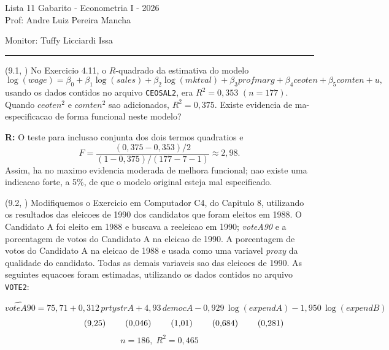 \documentclass[12pt,letterpaper, onecolumn]{exam}
\renewenvironment{solution}
{\par\noindent\textbf{R:}\enspace\color{blue}}
{\par\color{black}}
\begin{document}
\begingroup
\centering
\LARGE Lista 11 Gabarito - Econometria I - 2026\\[0.5em]
\large Prof: Andre Luiz Pereira Mancha \par
\large Monitor: Tuffy Licciardi Issa \par
\endgroup
\rule{\textwidth}{0.4pt}
\pointsdroppedatright
\printanswers
\renewcommand{\solutiontitle}{\noindent\textbf{Ans:}\enspace}
\newcommand{\qstar}{\hspace{-0.6em}\textsuperscript{*}\hspace{0.2em}}

\begin{questions}

\question (9.1, \citep{wooldridge2016}) No Exercicio 4.11, o \(R\)-quadrado da estimativa do modelo
\[
\log(wage)=\beta_0+\beta_1\log(sales)+\beta_2\log(mktval)+\beta_3 profmarg+\beta_4 ceoten+\beta_5 comten+u,
\]
usando os dados contidos no arquivo \texttt{CEOSAL2}, era \(R^2=0{,}353\) \((n=177)\). Quando \(ceoten^2\) e \(comten^2\) sao adicionados, \(R^2=0{,}375\). Existe evidencia de ma-especificacao de forma funcional neste modelo?

\begin{solution}
O teste para inclusao conjunta dos dois termos quadratios e
\[
F
=
\frac{(0,375-0,353)/2}{(1-0,375)/(177-7-1)}
\approx 2,98.
\]
Assim, ha no maximo evidencia moderada de melhora funcional; nao existe uma indicacao forte, a 5\%, de que o modelo original esteja mal especificado.
\end{solution}

\vspace{0.7cm}

\question (9.2, \citep{wooldridge2016}) Modifiquemos o Exercicio em Computador C4, do Capitulo 8, utilizando os resultados das eleicoes de 1990 dos candidatos que foram eleitos em 1988. O Candidato A foi eleito em 1988 e buscava a reeleicao em 1990; \textit{voteA90} e a porcentagem de votos do Candidato A na eleicao de 1990. A porcentagem de votos do Candidato A na eleicao de 1988 e usada como uma variavel \textit{proxy} da qualidade do candidato. Todas as demais variaveis sao das eleicoes de 1990. As seguintes equacoes foram estimadas, utilizando os dados contidos no arquivo \texttt{VOTE2}:

\[
\widehat{voteA90}=75{,}71+0{,}312\,prtystrA+4{,}93\,democA-0{,}929\,\log(expendA)-1{,}950\,\log(expendB)
\]
\[
\hspace{2.0cm}(9{,}25)\hspace{0.8cm}(0{,}046)\hspace{0.8cm}(1{,}01)\hspace{0.8cm}(0{,}684)\hspace{0.8cm}(0{,}281)
\]
\[
n=186,\; R^2=0{,}465
\]


\end{questions}
\end{document}
